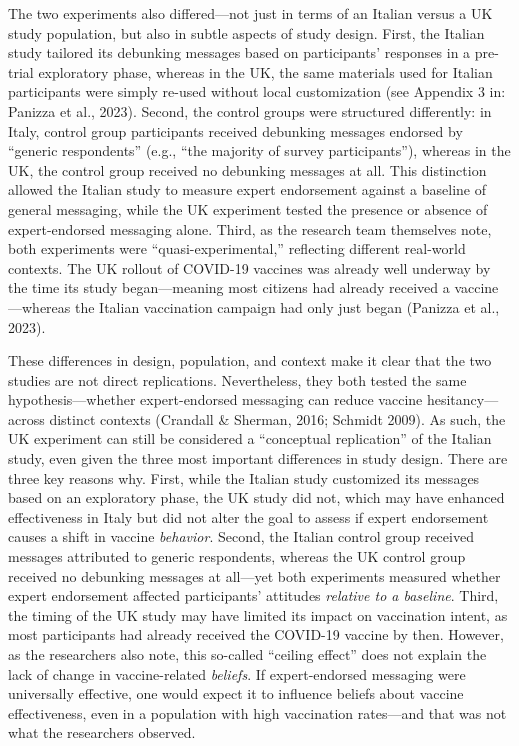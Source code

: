 \documentclass[authordate, empirical]{jote-new-article}
\begin{document}
	The two experiments also differed—not just in terms of an Italian versus a UK study population, but also in subtle aspects of study design. First, the Italian study tailored its debunking messages based on participants' responses in a pre-trial exploratory phase, whereas in the UK, the same materials used for Italian participants were simply re-used without local customization (see Appendix 3 in: Panizza et al., 2023). Second, the control groups were structured differently: in Italy, control group participants received debunking messages endorsed by “generic respondents” (e.g., “the majority of survey participants”), whereas in the UK, the control group received no debunking messages at all. This distinction allowed the Italian study to measure expert endorsement against a baseline of general messaging, while the UK experiment tested the presence or absence of expert-endorsed messaging alone. Third, as the research team themselves note, both experiments were “quasi-experimental,” reflecting different real-world contexts. The UK rollout of COVID-19 vaccines was already well underway by the time its study began—meaning most citizens had already received a vaccine—whereas the Italian vaccination campaign had only just began (Panizza et al., 2023).







	These differences in design, population, and context make it clear that the two studies are not direct replications. Nevertheless, they both tested the same hypothesis—whether expert-endorsed messaging can reduce vaccine hesitancy—across distinct contexts (Crandall \& Sherman, 2016; Schmidt 2009). As such, the UK experiment can still be considered a “conceptual replication” of the Italian study, even given the three most important differences in study design. There are three key reasons why. First, while the Italian study customized its messages based on an exploratory phase, the UK study did not, which may have enhanced effectiveness in Italy but did not alter the goal to assess if expert endorsement causes a shift in vaccine \emph{behavior}. Second, the Italian control group received messages attributed to generic respondents, whereas the UK control group received no debunking messages at all—yet both experiments measured whether expert endorsement affected participants' attitudes \emph{relative to a baseline}. Third, the timing of the UK study may have limited its impact on vaccination intent, as most participants had already received the COVID-19 vaccine by then. However, as the researchers also note, this so-called “ceiling effect” does not explain the lack of change in vaccine-related \emph{beliefs}. If expert-endorsed messaging were universally effective, one would expect it to influence beliefs about vaccine effectiveness, even in a population with high vaccination rates—and that was not what the researchers observed.
\end{document}
